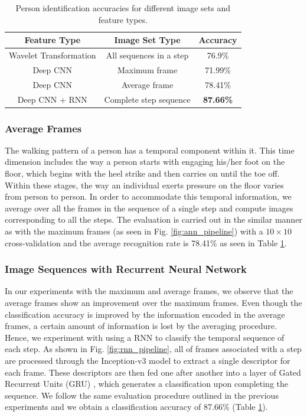 \begin{table}[!t]
	\renewcommand{\arraystretch}{1.3}
	\caption{Person identification accuracies for different image sets and feature types.}
	\label{tab:results}
	\centering
	\begin{tabular}{|c|c|c|}
		\hline
		\bfseries Feature Type & \bfseries Image Set Type & \bfseries Accuracy \\
		\hline
		Wavelet Transformation & All sequences in a step & 76.9\%\\
		\hline
		Deep CNN & Maximum frame & 71.99\%\\
		\hline
		Deep CNN & Average frame & 78.41\%\\
		\hline
		Deep CNN + RNN & Complete step sequence & \bfseries87.66\%\\
		\hline
	\end{tabular}
\end{table}

\subsubsection{Average Frames}
The walking pattern of a person has a temporal component within it. This time dimension includes the way a person starts with engaging his/her foot on the floor, which begins with the heel strike and then carries on until the toe off. Within these stages, the way an individual exerts pressure on the floor varies from person to person. In order to accommodate this temporal information, we average over all the frames in the sequence of a single step and compute images corresponding to all the steps. The evaluation is carried out in the similar manner as with the maximum frames (as seen in Fig. \ref{fig:ann_pipeline}) with a $10 \times 10$ cross-validation and the average recognition rate is 78.41\% as seen in Table \ref{tab:results}. 



\subsubsection{Image Sequences with Recurrent Neural Network}

 In our experiments with the maximum and average frames, we observe that the average frames show an improvement over the  maximum frames. Even though the classification accuracy is improved by the information encoded in the average frames, a certain amount of information is lost by the averaging procedure. Hence, we experiment with using a RNN to classify the temporal sequence of each step. As shown in Fig.  \ref{fig:rnn_pipeline}, all of frames associated with a step are processed through the Inception-v3 model to extract a single descriptor for each frame. 
These descriptors are then fed one after another into a layer of Gated Recurrent Units (GRU) \cite{cho2014properties}, which generates a classification upon completing the sequence. We follow the same evaluation procedure outlined in the previous experiments and we obtain a classification accuracy of 87.66\% (Table \ref{tab:results}).


